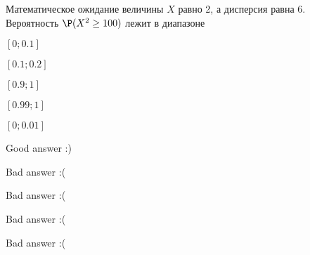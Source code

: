 
\begin{question}
Математическое ожидание величины \(X\) равно 2, а дисперсия равна 6.
Вероятность \(\P(X^2 \geq 100)\) лежит в диапазоне
\begin{answerlist}
  \item \([0;0.1]\)
  \item \([0.1;0.2]\)
  \item \([0.9;1]\)
  \item \([0.99;1]\)
  \item \([0;0.01]\)
\end{answerlist}
\end{question}

\begin{solution}
\begin{answerlist}
  \item Good answer :)
  \item Bad answer :(
  \item Bad answer :(
  \item Bad answer :(
  \item Bad answer :(
\end{answerlist}
\end{solution}

